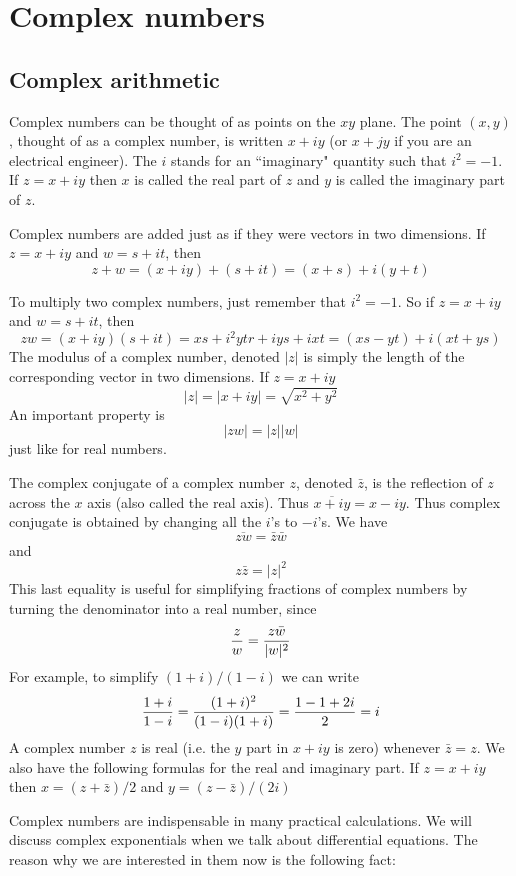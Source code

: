 \chapter{Complex numbers}

\section{Complex arithmetic}

Complex numbers can be thought of as points on the $xy$ plane. The
point $(x,y)$, thought of as a complex number, is written $x+iy$ (or
$x+jy$ if you are an electrical engineer).  The $i$ stands for an 
``imaginary" quantity such that $i^2 =-1$. 
If $z=x+iy$ then $x$ is
called the real part of $z$ and $y$ is called the imaginary part of
$z$.

Complex numbers are added just as if they were vectors in two
dimensions.  If $z=x+iy$ and $w=s+it$, then
\[
z+w=(x+iy) + (s+it) = (x+s) + i(y+t)
\]

To multiply two complex numbers, just remember that $i^2=-1$. So if
$z=x+iy$ and $w=s+it$, then
\[
zw=(x+iy)(s+it)=xs+i^2ytr +iys + ixt = (xs-yt) + i(xt+ys)
\]
The modulus of a complex number, denoted $|z|$ is simply the length of
the corresponding vector in two dimensions. If $z=x+iy$
\[
|z| = |x+iy|=\sqrt{x^2+y^2}
\]
An important property is
\[
|zw|=|z||w|
\]
just like for real numbers. 

The complex conjugate of a complex number $z$, denoted $\bar z$, is
the reflection of $z$ across the $x$ axis (also called the real axis). Thus
$\overline{x+iy}=x-iy$.  Thus complex conjugate is obtained by
changing all the $i$'s to $-i$'s.  We have
\[
\overline{zw}=\bar z \bar w
\]
and
\[
z\bar z= |z|^2
\]
This last equality is useful for simplifying fractions of complex
numbers by turning the denominator into a real number, since
\[
{{z}\over{w}} =  {{z\bar w}\over{|w|^2}}
\]
For example, to simplify $(1+i)/(1-i)$ we can write
\[
{{1+i}\over{1-i}} = {{(1+i)^2}\over{(1-i)(1+i)}}
   ={{1-1+2i}\over{2}}=i
\]
A complex number $z$ is real (i.e. the $y$ part in $x+iy$ is zero)
whenever $\bar z = z$. We also have the following formulas for the
real and imaginary part. If $z=x +i y$ then $x = (z+\bar z)/2$ and $y
= (z-\bar z)/(2i)$

Complex numbers are indispensable in many practical calculations. We
will discuss complex exponentials when we talk about differential
equations.  The reason why we are interested in them now is the
following fact:


